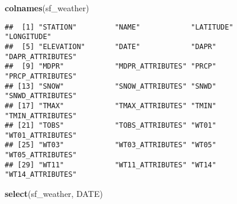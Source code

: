 \documentclass[
]{article}
\newenvironment{Shaded}{\begin{snugshade}}{\end{snugshade}}
\newcommand{\FunctionTok}[1]{\textcolor[rgb]{0.13,0.29,0.53}{\textbf{#1}}}
\newcommand{\NormalTok}[1]{#1}
\begin{document}
\begin{Shaded}
\begin{Highlighting}[]
\FunctionTok{colnames}\NormalTok{(sf\_weather)}
\end{Highlighting}
\end{Shaded}

\begin{verbatim}
##  [1] "STATION"         "NAME"            "LATITUDE"        "LONGITUDE"      
##  [5] "ELEVATION"       "DATE"            "DAPR"            "DAPR_ATTRIBUTES"
##  [9] "MDPR"            "MDPR_ATTRIBUTES" "PRCP"            "PRCP_ATTRIBUTES"
## [13] "SNOW"            "SNOW_ATTRIBUTES" "SNWD"            "SNWD_ATTRIBUTES"
## [17] "TMAX"            "TMAX_ATTRIBUTES" "TMIN"            "TMIN_ATTRIBUTES"
## [21] "TOBS"            "TOBS_ATTRIBUTES" "WT01"            "WT01_ATTRIBUTES"
## [25] "WT03"            "WT03_ATTRIBUTES" "WT05"            "WT05_ATTRIBUTES"
## [29] "WT11"            "WT11_ATTRIBUTES" "WT14"            "WT14_ATTRIBUTES"
\end{verbatim}

\begin{Shaded}
\begin{Highlighting}[]
\FunctionTok{select}\NormalTok{(sf\_weather, DATE)}
\end{Highlighting}
\end{Shaded}
\end{document}
